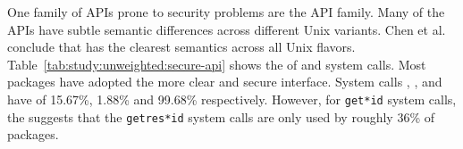 

One family of APIs prone to security problems are the %
 API family.
Many of the  APIs
have subtle semantic differences across different Unix variants.
Chen et al.~\cite{chen02setuid} conclude that 
 has the clearest semantics 
across all Unix flavors. 
Table~\ref{tab:study:unweighted:secure-api} shows the \unwusagemetric{} 
of  and  system calls.
Most packages have 
adopted the more clear and secure interface. 
System calls , , and  have
\unwusagemetric{} of 15.67\%, 1.88\% and 99.68\% respectively. 
However, for {\tt get*id} system calls, the \unwusagemetric{} suggests that the {\tt getres*id}
system calls %
are only used by roughly 36\% of packages.

